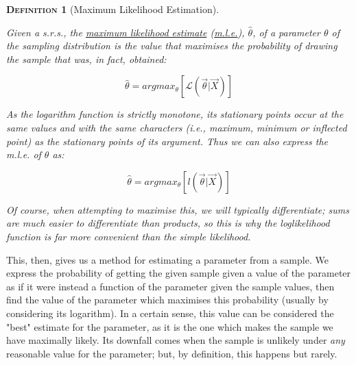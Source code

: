 \documentclass[12pt,a4paper]{article}
\newtheorem{definition}{\textsc{Definition}}[section]
\begin{document}
\begin{definition}[Maximum Likelihood Estimation]$\;$\par\vspace{1cm}

Given a s.r.s., the \underline{maximum likelihood estimate} (\underline{m.l.e.}), $\hat{\theta}$, of a parameter $\theta$ of the sampling distribution is the value that maximises the probability of drawing the sample that was, in fact, obtained:

$$\hat{\theta} = argmax_\theta \left[\mathcal{L}\left(\vec{\theta} | \vec{X}\right)\right]$$

As the logarithm function is strictly monotone, its stationary points occur at the same values and with the same characters (i.e., maximum, minimum or inflected point) as the stationary points of its argument. Thus we can also express the m.l.e. of $\theta$ as:

$$\hat{\theta} = argmax_\theta \left[l\left(\vec{\theta} | \vec{X}\right)\right]$$

Of course, when attempting to maximise this, we will typically differentiate; sums are much easier to differentiate than products, so this is why the loglikelihood function is far more convenient than the simple likelihood.

\end{definition}

This, then, gives us a method for estimating a parameter from a sample. We express the probability of getting the given sample given a value of the parameter as if it were instead a function of the parameter given the sample values, then find the value of the parameter which maximises this probability (usually by considering its logarithm). In a certain sense, this value can be considered the "best" estimate for the parameter, as it is the one which makes the sample we have maximally likely. Its downfall comes when the sample is unlikely under \emph{any} reasonable value for the parameter; but, by definition, this happens but rarely.
\end{document}

